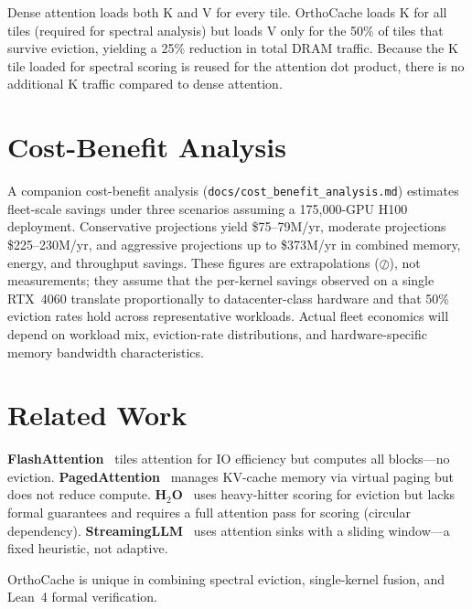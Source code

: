 \documentclass[conference]{IEEEtran}
\begin{document}
Dense attention loads both K and V for every tile. OrthoCache loads K
for all tiles (required for spectral analysis) but loads V only for
the 50\% of tiles that survive eviction, yielding a 25\% reduction in
total DRAM traffic. Because the K tile loaded for spectral scoring is
reused for the attention dot product, there is no additional K traffic
compared to dense attention.


\section{Cost-Benefit Analysis}\label{sec:cost}

A companion cost-benefit analysis (\texttt{docs/cost\_benefit\_analysis.md})
estimates fleet-scale savings under three scenarios assuming a
175{,}000-GPU H100 deployment. Conservative projections yield
\$75--79M/yr, moderate projections \$225--230M/yr, and aggressive
projections up to \$373M/yr in combined memory, energy, and throughput
savings. These figures are extrapolations ($\oslash$), not
measurements; they assume that the per-kernel savings observed on a
single RTX~4060 translate proportionally to datacenter-class hardware
and that 50\% eviction rates hold across representative workloads.
Actual fleet economics will depend on workload mix, eviction-rate
distributions, and hardware-specific memory bandwidth characteristics.


\section{Related Work}\label{sec:related}

\textbf{FlashAttention}~\cite{dao2023flashattention2} tiles attention
for IO efficiency but computes all blocks---no eviction.
\textbf{PagedAttention}~\cite{kwon2023pagedattention} manages KV-cache
memory via virtual paging but does not reduce compute.
\textbf{H$_2$O}~\cite{zhang2023h2o} uses heavy-hitter scoring for
eviction but lacks formal guarantees and requires a full attention
pass for scoring (circular dependency).
\textbf{StreamingLLM}~\cite{xiao2023streamingllm} uses attention sinks
with a sliding window---a fixed heuristic, not adaptive.

OrthoCache is unique in combining spectral eviction, single-kernel
fusion, and Lean~4 formal verification.


\end{document}
